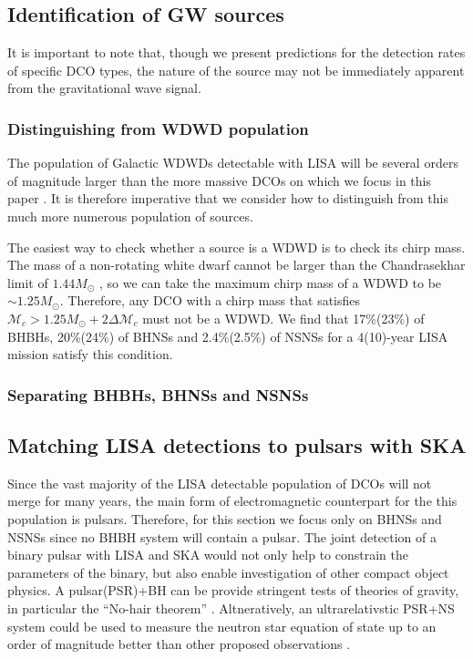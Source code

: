 \subsection{Identification of GW sources}
It is important to note that, though we present predictions for the detection rates of specific DCO types, the nature of the source may not be immediately apparent from the gravitational wave signal.

\subsubsection{Distinguishing from WDWD population}
The population of Galactic WDWDs detectable with LISA will be several orders of magnitude larger than the more massive DCOs on which we focus in this paper \citep[e.g.][]{Korol+2017}. It is therefore imperative that we consider how to distinguish from this much more numerous population of sources.

The easiest way to check whether a source is a WDWD is to check its chirp mass. The mass of a non-rotating white dwarf cannot be larger than the Chandrasekhar limit of $1.44 \unit{M_\odot}$ \citep{Chandrasekhar+1931}, so we can take the maximum chirp mass of a WDWD to be $\sim 1.25 \unit{M_{\odot}}$. Therefore, any DCO with a chirp mass that satisfies $\mathcal{M}_c > 1.25 \unit{M_{\odot}} + 2 \Delta \mathcal{M}_c$ must not be a WDWD. We find that 17\%(23\%) of BHBHs, 20\%(24\%) of BHNSs and 2.4\%(2.5\%) of NSNSs for a 4(10)-year LISA mission satisfy this condition.


\subsubsection{Separating BHBHs, BHNSs and NSNSs}

\todo{}

\subsection{Matching LISA detections to pulsars with SKA}\label{sec:pulsar_matching}
Since the vast majority of the LISA detectable population of DCOs will not merge for many years, the main form of electromagnetic counterpart for the this population is pulsars. Therefore, for this section we focus only on BHNSs and NSNSs since no BHBH system will contain a pulsar. The joint detection of a binary pulsar with LISA and SKA would not only help to constrain the parameters of the binary, but also enable investigation of other compact object physics. A pulsar(PSR)+BH can be provide stringent tests of theories of gravity, in particular the ``No-hair theorem'' \citep{Keane+2015}. Altneratively, an ultrarelativstic PSR+NS system could be used to measure the neutron star equation of state up to an order of magnitude better than other proposed observations \citep{Kyutoku+2019, Thrane+2020}.

